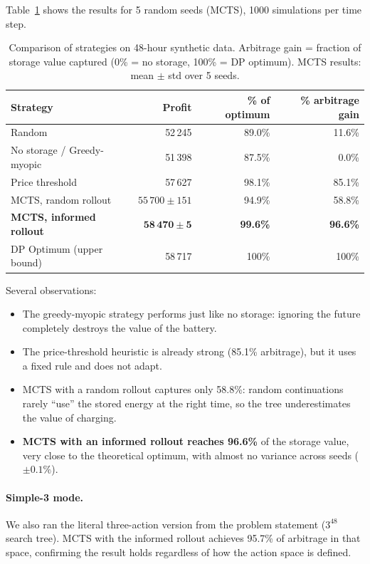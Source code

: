 \documentclass[12pt,a4paper]{article}
\begin{document}
Table~\ref{tab:det_results} shows the results for 5 random seeds (MCTS),
1000 simulations per time step.

\begin{table}[H]
  \centering
  \caption{Comparison of strategies on 48-hour synthetic data.
           Arbitrage gain = fraction of storage value captured
           (0\% = no storage, 100\% = DP optimum).
           MCTS results: mean $\pm$ std over 5 seeds.}
  \label{tab:det_results}
  \begin{tabular}{lrrr}
    \toprule
    Strategy & Profit & \% of optimum & \% arbitrage gain \\
    \midrule
    Random                     & 52\,245   & 89.0\% &  11.6\% \\
    No storage / Greedy-myopic & 51\,398   & 87.5\% &   0.0\% \\
    Price threshold            & 57\,627   & 98.1\% &  85.1\% \\
    MCTS, random rollout       & $55\,700 \pm 151$ & 94.9\% & 58.8\% \\
    \textbf{MCTS, informed rollout} & $\mathbf{58\,470 \pm 5}$ & \textbf{99.6\%} & \textbf{96.6\%} \\
    DP Optimum (upper bound)   & 58\,717   & 100\% & 100\% \\
    \bottomrule
  \end{tabular}
\end{table}

Several observations:
\begin{itemize}
  \item The greedy-myopic strategy performs just like no storage: ignoring
    the future completely destroys the value of the battery.
  \item The price-threshold heuristic is already strong (85.1\% arbitrage),
    but it uses a fixed rule and does not adapt.
  \item MCTS with a random rollout captures only 58.8\%: random continuations
    rarely ``use'' the stored energy at the right time, so the tree
    underestimates the value of charging.
  \item \textbf{MCTS with an informed rollout reaches 96.6\%} of the storage
    value, very close to the theoretical optimum, with almost no variance
    across seeds ($\pm 0.1\%$).
\end{itemize}

\paragraph{Simple-3 mode.} We also ran the literal three-action version from
the problem statement ($3^{48}$ search tree). MCTS with the informed rollout
achieves 95.7\% of arbitrage in that space, confirming the result holds
regardless of how the action space is defined.
\end{document}
